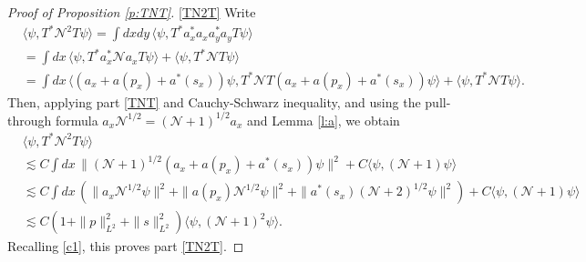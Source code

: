 \documentclass[11pt,a4paper,draft,DIV11]{scrartcl}	%
\newcommand{\N}{\mathcal{N}}
\newcommand{\K}{\mathcal{K}}
\renewcommand{\Re}{\operatorname{Re}\,} 	%
\begin{document}
\begin{proof}[Proof of Proposition \ref{p:TNT}]
  \eqref{TN2T} Write
  \begin{align*}
    & \langle \psi, T^* \N^2 T \psi \rangle = \int dxdy \, \langle \psi, T^* a_x^* a_x a_y^* a_y T \psi \rangle \\
    & = \int dx \, \langle \psi, T^* a_x^* \N a_x T \psi \rangle + \langle
    \psi, T^* \N T \psi \rangle \\
    & = \int dx \, \langle (a_x + a(p_x) + a^*(s_x)) \psi, T^* \N T (a_x +
    a(p_x) + a^*(s_x)) \psi \rangle + \langle \psi, T^* \N T \psi \rangle.
  \end{align*}
  Then, applying part \eqref{TNT} and Cauchy-Schwarz inequality, and using the
  pull-through formula $a_x \N^{1/2} = (\N+1)^{1/2} a_x$ and Lemma \ref{l:a},
  we obtain
  \begin{align*}
    & \langle \psi, T^* \N^2 T \psi \rangle \\
    & \apprle C \int dx \, \| (\N+1)^{1/2} (a_x + a(p_x) +
    a^*(s_x)) \psi \|^2 + C \langle \psi, (\N+1) \psi \rangle \\
    & \apprle C \int dx \, (\| a_x \N^{1/2} \psi \|^2 + \| a(p_x)
    \N^{1/2} \psi \|^2 + \| a^*(s_x) (\N+2)^{1/2} \psi \|^2 ) + C \langle
    \psi, (\N+1) \psi \rangle \\
    & \apprle C(1 + \| p \|_{L^2}^2 + \| s \|_{L^2}^2) \langle \psi, (\N+1)^2
    \psi \rangle.
  \end{align*}
  Recalling \eqref{c1}, this proves part \eqref{TN2T}.
\iffalse
  \eqref{fKf} By Cauchy-Schwarz inequality, a brief calculation, and Lemma
  \ref{l:a},
  \begin{align*}
    \langle \psi, \phi(\varphi) \K \phi(\varphi) \psi \rangle & = \| \K^{1/2}
    (a^*(\varphi) + a(\varphi) ) \psi \|^2 \\
    & \apprle \langle \psi, a(\varphi) \K a^*(\varphi) \psi \rangle + \langle
    \psi, a^*(\varphi) \K a(\varphi) \psi \rangle \\
    & = \int dx \, \| a^*(\varphi) \nabla_x a_x \psi \|^2 + \int dx \, \|
    a(\varphi) \nabla_x a_x \psi \|^2 + \int dx \, |\nabla \varphi(x)|^2 \\
    & \quad - 2 \Re \int dx dy \, \langle \nabla \varphi(x) a_y \psi, f(y)
    \nabla_x a_x \psi \rangle \\
    & \apprle \| \varphi \|_{L^2}^2 \int dx \, \| (\N + 1)^{1/2} \nabla_x a_x
    \psi \|^2 + \int dx \, | \nabla \varphi(x) |^2 \\
    & \quad + \int dx dy \, | \nabla \varphi(x)|^2 \| a_y \psi \|^2 + \int dx
    dy \, |f(y)|^2 \| \nabla_x a_x \psi \|^2 \\
    & = \| \varphi \|_{L^2}^2 \langle \psi, \K (\N + 1) \psi \rangle + \|
    \nabla \varphi \|_{L^2}^2 \langle \psi, (\N + 1) \psi \rangle.
  \end{align*}
  This proves part \eqref{fKf} and completes the proof of the proposition.\fi
\end{proof}
\end{document}
